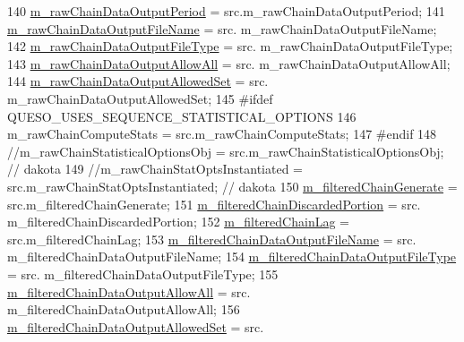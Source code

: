 \begin{DoxyCode}
140   \hyperlink{class_q_u_e_s_o_1_1_mh_options_values_ad838a3095d5158e27b9af55597822d31}{m\_rawChainDataOutputPeriod}                  = src.m\_rawChainDataOutputPeriod;
141   \hyperlink{class_q_u_e_s_o_1_1_mh_options_values_a0ff310cdab62e1bdbff8663f8a6b1c77}{m\_rawChainDataOutputFileName}                = src.
      m\_rawChainDataOutputFileName;
142   \hyperlink{class_q_u_e_s_o_1_1_mh_options_values_ae435f8be38f9f6407a2e0f75c53b4e76}{m\_rawChainDataOutputFileType}                = src.
      m\_rawChainDataOutputFileType;
143   \hyperlink{class_q_u_e_s_o_1_1_mh_options_values_a7bd5a3926443946479ea617918d6723f}{m\_rawChainDataOutputAllowAll}                = src.
      m\_rawChainDataOutputAllowAll;
144   \hyperlink{class_q_u_e_s_o_1_1_mh_options_values_a99f722385d57bcb24542f3969c3764cd}{m\_rawChainDataOutputAllowedSet}              = src.
      m\_rawChainDataOutputAllowedSet;
145 \textcolor{preprocessor}{#ifdef QUESO\_USES\_SEQUENCE\_STATISTICAL\_OPTIONS}
146 \textcolor{preprocessor}{}  m\_rawChainComputeStats                      = src.m\_rawChainComputeStats;
147 \textcolor{preprocessor}{#endif}
148 \textcolor{preprocessor}{}\textcolor{comment}{//m\_rawChainStatisticalOptionsObj             = src.m\_rawChainStatisticalOptionsObj; // dakota}
149 \textcolor{comment}{//m\_rawChainStatOptsInstantiated              = src.m\_rawChainStatOptsInstantiated; // dakota}
150   \hyperlink{class_q_u_e_s_o_1_1_mh_options_values_afe02816132a862e807ea3675b4125ccb}{m\_filteredChainGenerate}                     = src.m\_filteredChainGenerate;
151   \hyperlink{class_q_u_e_s_o_1_1_mh_options_values_afdaa37947c3a5c5acc11b89fa0a98fb9}{m\_filteredChainDiscardedPortion}             = src.
      m\_filteredChainDiscardedPortion;
152   \hyperlink{class_q_u_e_s_o_1_1_mh_options_values_abd87b32b15f3ce695d910b48d837094f}{m\_filteredChainLag}                          = src.m\_filteredChainLag;
153   \hyperlink{class_q_u_e_s_o_1_1_mh_options_values_a337b2f1161814f1c52153cbe7706f59a}{m\_filteredChainDataOutputFileName}           = src.
      m\_filteredChainDataOutputFileName;
154   \hyperlink{class_q_u_e_s_o_1_1_mh_options_values_adc3052dc0f1c2fd5072cb415a0eb3265}{m\_filteredChainDataOutputFileType}           = src.
      m\_filteredChainDataOutputFileType;
155   \hyperlink{class_q_u_e_s_o_1_1_mh_options_values_a249e8720b4570d5f4e6504a29a84ac04}{m\_filteredChainDataOutputAllowAll}           = src.
      m\_filteredChainDataOutputAllowAll;
156   \hyperlink{class_q_u_e_s_o_1_1_mh_options_values_ab465e2184857848c2276578b2b08baab}{m\_filteredChainDataOutputAllowedSet}         = src.

\end{DoxyCode}
